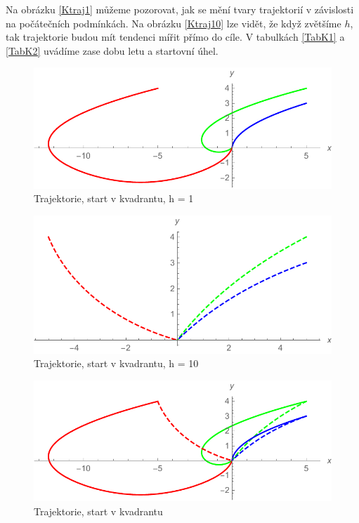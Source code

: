 \documentclass[reqno, a4paper]{amsart}
\numberwithin{equation}{section}
\begin{document}
Na obrázku \eqref{Ktraj1} můžeme pozorovat, jak se mění tvary trajektorií v závislosti na počátečních podmínkách. Na obrázku \eqref{Ktraj10} lze vidět, že když zvětšíme $h$, tak trajektorie budou mít tendenci mířit přímo do cíle. V tabulkách \eqref{TabK1} a \eqref{TabK2} uvádíme zase dobu letu a startovní úhel.
\begin{figure}
\includegraphics[scale=0.7]{figures/Kvad2.pdf}
\caption{Trajektorie, start v kvadrantu, h = 1}
\label{Ktraj1}
\end{figure}
\begin{figure}
\includegraphics[scale=0.7]{figures/Kvad3.pdf}
\caption{Trajektorie, start v kvadrantu, h = 10}
\label{Ktraj10}
\end{figure}
\begin{figure}
\includegraphics[scale=0.7]{figures/Kvad1.pdf}
\caption{Trajektorie, start v kvadrantu}
\label{Ktraj}
\end{figure}
\end{document}
